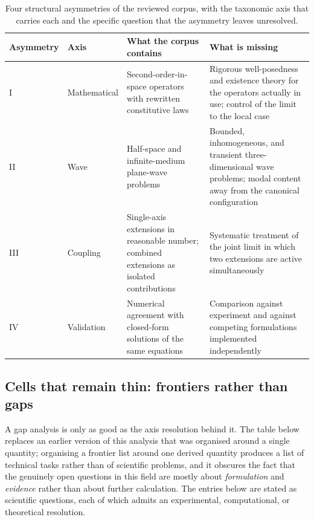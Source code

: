 \begin{table}[h]
\centering
\small
\caption{Four structural asymmetries of the reviewed corpus, with the taxonomic axis that carries each and the specific question that the asymmetry leaves unresolved.}
\label{tab:asymmetries}
\begin{tabularx}{\textwidth}{@{}lXlX@{}}
\toprule
\textbf{Asymmetry} & \textbf{Axis} & \textbf{What the corpus contains} & \textbf{What is missing} \\
\midrule
I & Mathematical & Second-order-in-space operators with rewritten constitutive laws & Rigorous well-posedness and existence theory for the operators actually in use; control of the limit to the local case \\
II & Wave & Half-space and infinite-medium plane-wave problems & Bounded, inhomogeneous, and transient three-dimensional wave problems; modal content away from the canonical configuration \\
III & Coupling & Single-axis extensions in reasonable number; combined extensions as isolated contributions & Systematic treatment of the joint limit in which two extensions are active simultaneously \\
IV & Validation & Numerical agreement with closed-form solutions of the same equations & Comparison against experiment and against competing formulations implemented independently \\
\bottomrule
\end{tabularx}
\end{table}

\subsection{Cells that remain thin: frontiers rather than gaps}
\label{sec:14.5}

A gap analysis is only as good as the axis resolution behind it. The table below replaces an earlier version of this analysis that was organised around a single quantity; organising a frontier list around one derived quantity produces a list of technical tasks rather than of scientific problems, and it obscures the fact that the genuinely open questions in this field are mostly about \emph{formulation} and \emph{evidence} rather than about further calculation. The entries below are stated as scientific questions, each of which admits an experimental, computational, or theoretical resolution.

